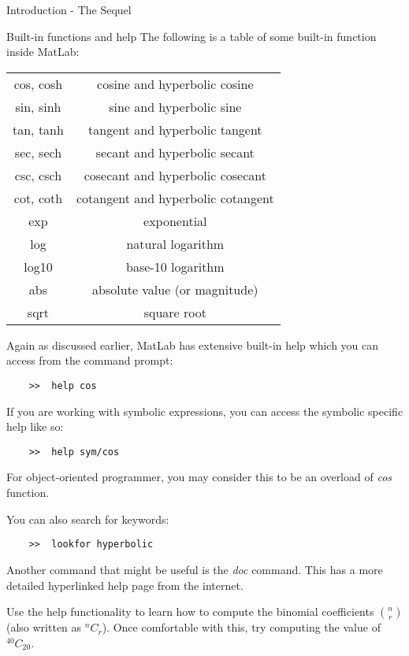 \documentclass[11pt, oneside]{report}   	%
\begin{document}
\begin{chapter}{Introduction - The Sequel}
\begin{section}{Built-in functions and help}
The following is a table of some built-in function inside MatLab:
\begin{center}
\begin{tabular}{| c | c |}
cos, cosh & cosine and hyperbolic cosine \\
sin, sinh & sine and hyperbolic sine \\
tan, tanh & tangent and hyperbolic tangent \\
sec, sech & secant and hyperbolic secant \\
csc, csch & cosecant and hyperbolic cosecant \\
cot, coth & cotangent and hyperbolic cotangent \\
exp  & exponential \\
log & natural logarithm \\
log10 & base-10 logarithm \\
abs & absolute value (or magnitude) \\
sqrt & square root \\
\end{tabular}
\end{center}
Again as discussed earlier, MatLab has extensive built-in help which you can access from the command prompt:
\begin{lstlisting}
	>>	help cos
\end{lstlisting}
If you are working with symbolic expressions, you can access the symbolic specific help like so:
\begin{lstlisting}
	>>	help sym/cos
\end{lstlisting}
For object-oriented programmer, you may consider this to be an overload of \textit{cos} function.

You can also search for keywords:

\begin{lstlisting}
	>>	lookfor hyperbolic
\end{lstlisting}

Another command that might be useful is the \textit{doc} command. This has a more detailed hyperlinked help page
from the internet.

\end{section}

\begin{Exercise}
Use the help functionality to learn how to compute the binomial coefficients ${n\choose r}$ (also written as
$^nC_r$). Once comfortable with this, try computing the value of $^{40}C_{20}$.


\end{Exercise}
\end{chapter}
\end{document}
